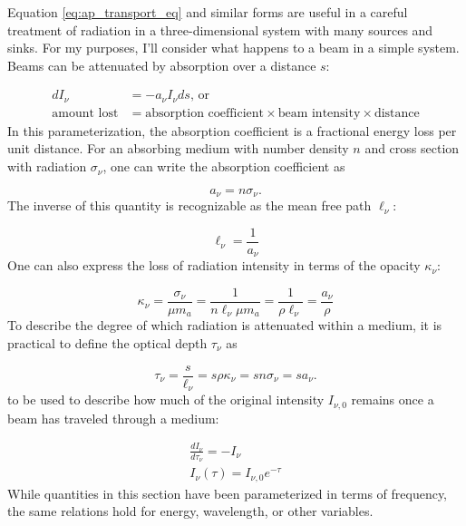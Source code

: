 \documentclass[12pt]{article}
\newcommand{\deriv}[2]{\frac{d #1}{d #2}}
\begin{document}
Equation \ref{eq:ap_transport_eq} and similar forms are useful in a careful treatment of radiation in a three-dimensional system with many sources and sinks. For my purposes, I'll consider what happens to a beam in a simple system. Beams can be attenuated by absorption over a distance $s$:

\begin{align}
    dI_\nu &= -a_\nu I_\nu ds \text{, or} \\
    \text{amount lost} &= \text{absorption coefficient} \times \text{beam intensity} \times \text{distance}
\end{align}
%
In this parameterization, the absorption coefficient is a fractional energy loss per unit distance. For an absorbing medium with number density $n$ and cross section with radiation $\sigma_\nu$, one can write the absorption coefficient as

\begin{equation}
    a_\nu = n\sigma_\nu.
\end{equation}
%
The inverse of this quantity is recognizable as the mean free path $\ell_\nu$:

\begin{equation}
    \ell_\nu = \frac{1}{a_\nu}
\end{equation}
%
One can also express the loss of radiation intensity in terms of the opacity $\kappa_\nu$:

\begin{equation}
    \kappa_\nu = \frac{\sigma_\nu}{\mu m_a} = \frac{1}{n\ell_\nu \mu m_a} = \frac{1}{\rho \ell_\nu} = \frac{a_\nu}{\rho}
\end{equation}
%
To describe the degree of which radiation is attenuated within a medium, it is practical to define the optical depth $\tau_\nu$ as

\begin{equation}
    \tau_\nu = \frac{s}{\ell_\nu} = s\rho\kappa_\nu = sn\sigma_\nu = sa_\nu.
\end{equation}
%
to be used to describe how much of the original intensity $I_{\nu,0}$ remains once a beam has traveled through a medium:

\begin{align}
    \deriv{I_\nu}{\tau_\nu} = -I_\nu \\
    I_\nu (\tau) = I_{\nu,0} e^{-\tau}
\end{align}
%
While quantities in this section have been parameterized in terms of frequency, the same relations hold for energy, wavelength, or other variables.
\end{document}
